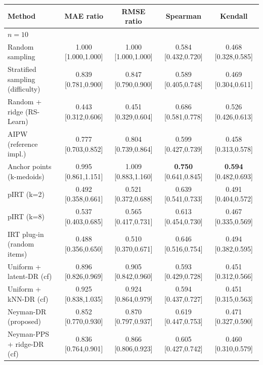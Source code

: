 \begin{tabular}{l cccc}
\toprule
Method & MAE ratio & RMSE ratio & Spearman & Kendall\\
\midrule
\multicolumn{5}{l}{\emph{$n=10$}}\\
Random sampling & 1.000 {\scriptsize[1.000,1.000]} & 1.000 {\scriptsize[1.000,1.000]} & 0.584 {\scriptsize[0.432,0.720]} & 0.468 {\scriptsize[0.328,0.585]} \\
Stratified sampling (difficulty) & 0.839 {\scriptsize[0.781,0.900]} & 0.847 {\scriptsize[0.790,0.900]} & 0.589 {\scriptsize[0.405,0.748]} & 0.469 {\scriptsize[0.304,0.611]} \\
Random + ridge (RS-Learn) & 0.443 {\scriptsize[0.312,0.606]} & 0.451 {\scriptsize[0.329,0.604]} & 0.686 {\scriptsize[0.581,0.778]} & 0.526 {\scriptsize[0.426,0.613]} \\
AIPW (reference impl.) & 0.777 {\scriptsize[0.703,0.852]} & 0.804 {\scriptsize[0.739,0.864]} & 0.599 {\scriptsize[0.427,0.739]} & 0.458 {\scriptsize[0.313,0.578]} \\
Anchor points (k-medoids) & 0.995 {\scriptsize[0.861,1.151]} & 1.009 {\scriptsize[0.883,1.160]} & \textbf{0.750} {\scriptsize[0.641,0.845]} & \textbf{0.594} {\scriptsize[0.482,0.693]} \\
pIRT (k=2) & 0.492 {\scriptsize[0.358,0.661]} & 0.521 {\scriptsize[0.372,0.688]} & 0.639 {\scriptsize[0.541,0.733]} & 0.491 {\scriptsize[0.404,0.572]} \\
pIRT (k=8) & 0.537 {\scriptsize[0.403,0.685]} & 0.565 {\scriptsize[0.417,0.731]} & 0.613 {\scriptsize[0.454,0.730]} & 0.467 {\scriptsize[0.335,0.569]} \\
IRT plug-in (random items) & 0.488 {\scriptsize[0.356,0.650]} & 0.510 {\scriptsize[0.370,0.671]} & 0.646 {\scriptsize[0.516,0.754]} & 0.494 {\scriptsize[0.382,0.595]} \\
Uniform + latent-DR (cf) & 0.896 {\scriptsize[0.826,0.969]} & 0.905 {\scriptsize[0.842,0.960]} & 0.593 {\scriptsize[0.429,0.728]} & 0.451 {\scriptsize[0.312,0.566]} \\
Uniform + kNN-DR (cf) & 0.925 {\scriptsize[0.838,1.035]} & 0.924 {\scriptsize[0.864,0.979]} & 0.594 {\scriptsize[0.437,0.727]} & 0.451 {\scriptsize[0.315,0.563]} \\
Neyman-DR (proposed) & 0.852 {\scriptsize[0.770,0.930]} & 0.870 {\scriptsize[0.797,0.937]} & 0.619 {\scriptsize[0.447,0.753]} & 0.471 {\scriptsize[0.327,0.590]} \\
Neyman-PPS + ridge-DR (cf) & 0.836 {\scriptsize[0.764,0.901]} & 0.866 {\scriptsize[0.806,0.923]} & 0.605 {\scriptsize[0.427,0.742]} & 0.460 {\scriptsize[0.310,0.579]} \\

\end{tabular}
